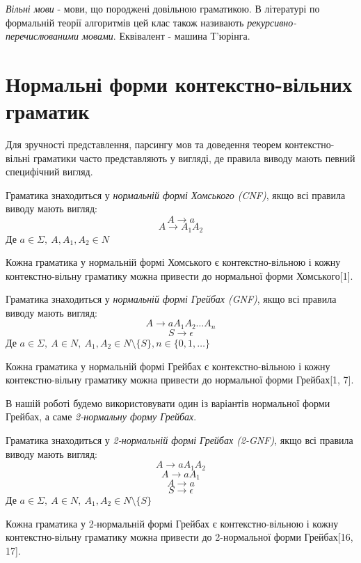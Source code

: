 \textit{Вільні мови} - мови, що породжені довільною граматикою. В літературі по формальній теорії алгоритмів цей клас також називають \textit{рекурсивно-перечислюваними мовами}. Еквівалент - машина Т'юрінга.

\section{Нормальні форми контекстно-вільних граматик}
Для зручності представлення, парсингу мов та доведення теорем контекстно-вільні граматики часто представляють у вигляді, де правила виводу мають певний специфічний вигляд.
\begin{definition}
Граматика знаходиться у \textit{нормальній формі Хомського (CNF)}, якщо всі правила виводу мають вигляд:
$$ A \rightarrow a $$
$$ A \rightarrow A_1A_2 $$
Де $ a \in \Sigma,\ A, A_1, A_2 \in N $
\end{definition}
\begin{theorem}
Кожна граматика у нормальній формі Хомського є контекстно-вільною і кожну контекстно-вільну граматику можна привести до нормальної форми Хомського[1].
\end{theorem}

\begin{definition}
Граматика знаходиться у \textit{нормальній формі Грейбах (GNF)}, якщо всі правила виводу мають вигляд:
$$ A \rightarrow a A_1 A_2 \dots A_n $$
$$ S \rightarrow \epsilon $$
Де $ a \in \Sigma,\ A \in N,\ A_1, A_2 \in N \setminus \{S\}, n \in \{ 0,1,\dots \} $
\end{definition}

\begin{theorem}
Кожна граматика у нормальній формі Грейбах є контекстно-вільною і кожну контекстно-вільну граматику можна привести до нормальної форми Грейбах[1, 7].
\end{theorem}

В нашій роботі будемо використовувати один із варіантів нормальної форми Грейбах, а саме \textit{2-нормальну форму Грейбах}.
\begin{definition}
Граматика знаходиться у \textit{2-нормальній формі Грейбах (2-GNF)}, якщо всі правила виводу мають вигляд:
$$ A \rightarrow a A_1 A_2 $$
$$ A \rightarrow a A_1 $$
$$ A \rightarrow a $$
$$ S \rightarrow \epsilon $$
Де $ a \in \Sigma,\ A \in N,\ A_1, A_2 \in N \setminus \{S\} $
\end{definition}

\begin{theorem}
Кожна граматика у 2-нормальній формі Грейбах є контекстно-вільною і кожну контекстно-вільну граматику можна привести до 2-нормальної форми Грейбах[16, 17].
\end{theorem}

